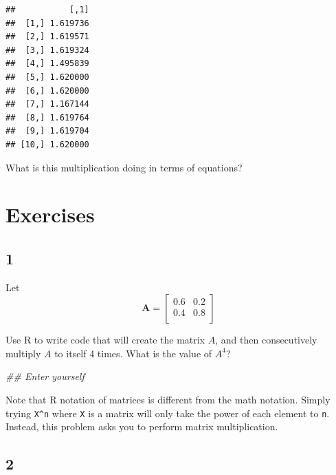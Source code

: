 \documentclass[]{book}
\newenvironment{Shaded}{\begin{snugshade}}{\end{snugshade}}
\newcommand{\CommentTok}[1]{\textcolor[rgb]{0.56,0.35,0.01}{\textit{#1}}}
\newcommand{\NormalTok}[1]{#1}
\newcommand{\OperatorTok}[1]{\textcolor[rgb]{0.81,0.36,0.00}{\textbf{#1}}}
\newcommand{\StringTok}[1]{\textcolor[rgb]{0.31,0.60,0.02}{#1}}
\theoremstyle{definition}
\theoremstyle{definition}
\theoremstyle{definition}
\theoremstyle{remark}
\begin{document}
\begin{Shaded}
\end{Shaded}

\begin{verbatim}
##           [,1]
##  [1,] 1.619736
##  [2,] 1.619571
##  [3,] 1.619324
##  [4,] 1.495839
##  [5,] 1.620000
##  [6,] 1.620000
##  [7,] 1.167144
##  [8,] 1.619764
##  [9,] 1.619704
## [10,] 1.620000
\end{verbatim}

What is this multiplication doing in terms of equations?

\hypertarget{exercises-1}{%
\section*{Exercises}\label{exercises-1}}

\hypertarget{section-9}{%
\subsection*{1}\label{section-9}}

Let
\[\mathbf{A} = \left[\begin{array}
{rrr}
0.6 & 0.2\\
0.4 & 0.8\\
\end{array}\right]
\]

Use R to write code that will create the matrix \(A\), and then consecutively multiply \(A\) to itself 4 times. What is the value of \(A^{4}\)?

\begin{Shaded}
\begin{Highlighting}[]
\CommentTok{## Enter yourself}
\end{Highlighting}
\end{Shaded}

Note that R notation of matrices is different from the math notation. Simply trying \texttt{X\^{}n} where \texttt{X} is a matrix will only take the power of each element to \texttt{n}. Instead, this problem asks you to perform matrix multiplication.

\hypertarget{section-10}{%
\subsection*{2}\label{section-10}}
\end{document}
